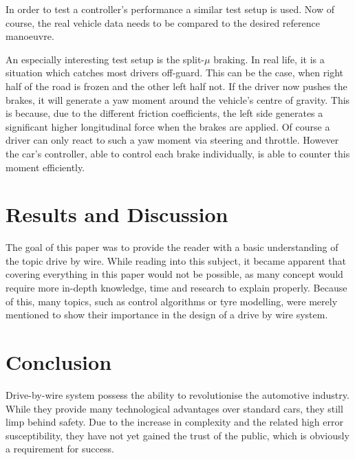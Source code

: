 \documentclass[conference]{IEEEtran}
\begin{document}
In order to test a controller's performance a similar test setup is used. Now of course, the real vehicle data needs to be compared to the desired reference manoeuvre.

An especially interesting test setup is the split-$\mu$ braking. In real life, it is a situation which catches most drivers off-guard. This can be the case, when right half of the road is frozen and the other left half not. If the driver now pushes the brakes, it will generate a yaw moment around the vehicle's centre of gravity. This is because, due to the different friction coefficients, the left side generates a significant higher longitudinal force when the brakes are applied. Of course a driver can only react to such a yaw moment via steering and throttle. However the car's controller, able to control each brake individually, is able to counter this moment efficiently.


\section{Results and Discussion}

The goal of this paper was to provide the reader with a basic understanding of the topic drive by wire. While reading into this subject, it became apparent that covering everything in this paper would not be possible, as many concept would require more in-depth knowledge, time and research to explain properly. Because of this, many topics, such as control algorithms or tyre modelling, were merely mentioned to show their importance in the design of a drive by wire system.

\section{Conclusion}

Drive-by-wire system possess the ability to revolutionise the automotive industry. While they provide many technological advantages over standard cars, they still limp behind safety. Due to the increase in complexity and the related high error susceptibility, they have not yet gained the trust of the public, which is obviously a requirement for success. 
\end{document}
